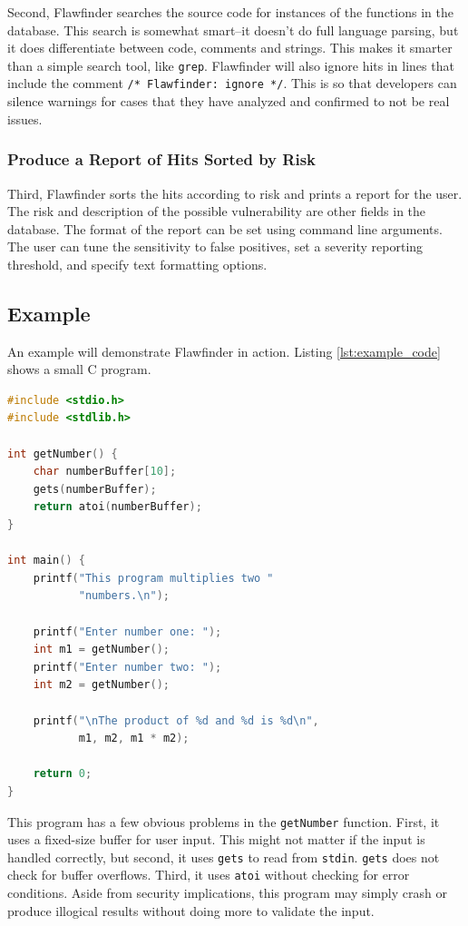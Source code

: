 \documentclass[journal]{IEEEtran}
\def\tt#1{\mbox{\texttt{#1}}}
\begin{document}
Second, Flawfinder searches the source code for instances of the functions in the database. This
search is somewhat smart--it doesn't do full language parsing, but it does differentiate between
code, comments and strings. This makes it smarter than a simple search tool, like \tt{grep}.
Flawfinder will also ignore hits in lines that include the comment \tt{/* Flawfinder: ignore */}.
This is so that developers can silence warnings for cases that they have analyzed and confirmed to
not be real issues.

\subsubsection{Produce a Report of Hits Sorted by Risk}

Third, Flawfinder sorts the hits according to risk and prints a report for the user. The risk and
description of the possible vulnerability are other fields in the database. The format of the report
can be set using command line arguments. The user can tune the sensitivity to false positives, set
a severity reporting threshold, and specify text formatting options.

\subsection{Example}

An example will demonstrate Flawfinder in action. Listing \ref{lst:example_code} shows a small C
program.

\begin{lstlisting}[language=c, caption=C Example Program, label=lst:example_code]
#include <stdio.h>
#include <stdlib.h>

int getNumber() {
    char numberBuffer[10];
    gets(numberBuffer);
    return atoi(numberBuffer);
}

int main() {
    printf("This program multiplies two "
           "numbers.\n");

    printf("Enter number one: ");
    int m1 = getNumber();
    printf("Enter number two: ");
    int m2 = getNumber();

    printf("\nThe product of %d and %d is %d\n",
           m1, m2, m1 * m2);

    return 0;
}
\end{lstlisting}

This program has a few obvious problems in the \tt{getNumber} function. First, it uses a fixed-size
buffer for user input. This might not matter if the input is handled correctly, but second, it uses
\tt{gets} to read from \tt{stdin}. \tt{gets} does not check for buffer overflows. Third, it uses
\tt{atoi} without checking for error conditions. Aside from security implications, this program may
simply crash or produce illogical results without doing more to validate the input.
\end{document}
